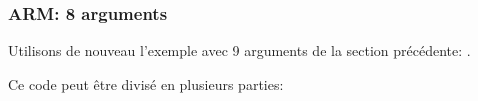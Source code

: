 \subsubsection{ARM: 8 arguments}

Utilisons de nouveau l'exemple avec 9 arguments de la section précédente: .



\myparagraph{\OptimizingKeilVI: \ARMMode}



Ce code peut être divisé en plusieurs parties:


